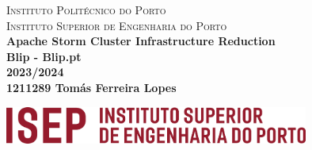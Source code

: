 \begin{titlepage}
    \center 

    \textsc{
        Instituto Politécnico do Porto\\[3mm]
        \LARGE Instituto Superior de Engenharia do Porto
    }
    \HRuleFront
    \\[4cm]

    {\huge \bfseries Apache Storm Cluster Infrastructure Reduction}\\[.5cm]

    {\bfseries Blip - Blip.pt }\\[1cm]
    {\Large \bfseries 2023/2024}\\[2cm]

    {\Large\bf 1211289 Tomás Ferreira Lopes}


    \vfill

    \includegraphics[width=10cm, keepaspectratio]{media/isep/isep.jpg}\\

\end{titlepage}
